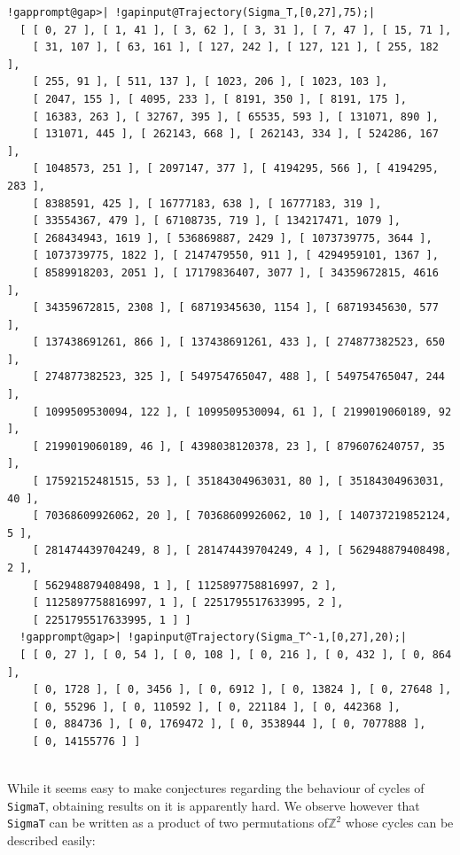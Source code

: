 \documentclass[a4paper,11pt]{report}
\begin{document}
{{\begin{Verbatim}[commandchars=!@|,fontsize=\small,frame=single,label=Example]
  !gapprompt@gap>| !gapinput@Trajectory(Sigma_T,[0,27],75);|
  [ [ 0, 27 ], [ 1, 41 ], [ 3, 62 ], [ 3, 31 ], [ 7, 47 ], [ 15, 71 ], 
    [ 31, 107 ], [ 63, 161 ], [ 127, 242 ], [ 127, 121 ], [ 255, 182 ], 
    [ 255, 91 ], [ 511, 137 ], [ 1023, 206 ], [ 1023, 103 ], 
    [ 2047, 155 ], [ 4095, 233 ], [ 8191, 350 ], [ 8191, 175 ], 
    [ 16383, 263 ], [ 32767, 395 ], [ 65535, 593 ], [ 131071, 890 ], 
    [ 131071, 445 ], [ 262143, 668 ], [ 262143, 334 ], [ 524286, 167 ], 
    [ 1048573, 251 ], [ 2097147, 377 ], [ 4194295, 566 ], [ 4194295, 283 ], 
    [ 8388591, 425 ], [ 16777183, 638 ], [ 16777183, 319 ], 
    [ 33554367, 479 ], [ 67108735, 719 ], [ 134217471, 1079 ], 
    [ 268434943, 1619 ], [ 536869887, 2429 ], [ 1073739775, 3644 ], 
    [ 1073739775, 1822 ], [ 2147479550, 911 ], [ 4294959101, 1367 ], 
    [ 8589918203, 2051 ], [ 17179836407, 3077 ], [ 34359672815, 4616 ], 
    [ 34359672815, 2308 ], [ 68719345630, 1154 ], [ 68719345630, 577 ], 
    [ 137438691261, 866 ], [ 137438691261, 433 ], [ 274877382523, 650 ], 
    [ 274877382523, 325 ], [ 549754765047, 488 ], [ 549754765047, 244 ], 
    [ 1099509530094, 122 ], [ 1099509530094, 61 ], [ 2199019060189, 92 ], 
    [ 2199019060189, 46 ], [ 4398038120378, 23 ], [ 8796076240757, 35 ], 
    [ 17592152481515, 53 ], [ 35184304963031, 80 ], [ 35184304963031, 40 ], 
    [ 70368609926062, 20 ], [ 70368609926062, 10 ], [ 140737219852124, 5 ], 
    [ 281474439704249, 8 ], [ 281474439704249, 4 ], [ 562948879408498, 2 ], 
    [ 562948879408498, 1 ], [ 1125897758816997, 2 ], 
    [ 1125897758816997, 1 ], [ 2251795517633995, 2 ], 
    [ 2251795517633995, 1 ] ]
  !gapprompt@gap>| !gapinput@Trajectory(Sigma_T^-1,[0,27],20);|
  [ [ 0, 27 ], [ 0, 54 ], [ 0, 108 ], [ 0, 216 ], [ 0, 432 ], [ 0, 864 ], 
    [ 0, 1728 ], [ 0, 3456 ], [ 0, 6912 ], [ 0, 13824 ], [ 0, 27648 ], 
    [ 0, 55296 ], [ 0, 110592 ], [ 0, 221184 ], [ 0, 442368 ], 
    [ 0, 884736 ], [ 0, 1769472 ], [ 0, 3538944 ], [ 0, 7077888 ], 
    [ 0, 14155776 ] ]
  
\end{Verbatim}
 While it seems easy to make conjectures regarding the behaviour of cycles of \texttt{Sigma{\textunderscore}T}, obtaining results on it is apparently hard. We observe however that \texttt{Sigma{\textunderscore}T} can be written as a product of two permutations of{\nobreakspace}${\ensuremath{\mathbb Z}}^2$ whose cycles can be described easily: 
\begin{Verbatim}[commandchars=!@A,fontsize=\small,frame=single,label=Example]
  

\end{Verbatim}}}
\end{document}
